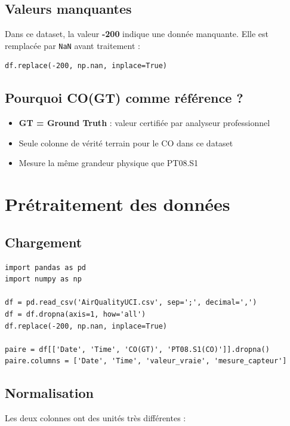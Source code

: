 \documentclass[12pt, a4paper]{article}
\begin{document}
\subsection{Valeurs manquantes}
Dans ce dataset, la valeur \textbf{-200} indique une donnée manquante. Elle est remplacée 
par \texttt{NaN} avant traitement :

\begin{lstlisting}[style=python, caption=Remplacement des valeurs manquantes]
df.replace(-200, np.nan, inplace=True)
\end{lstlisting}

\subsection{Pourquoi CO(GT) comme référence ?}
\begin{itemize}
    \item \textbf{GT = Ground Truth} : valeur certifiée par analyseur professionnel
    \item Seule colonne de vérité terrain pour le CO dans ce dataset
    \item Mesure la même grandeur physique que PT08.S1
\end{itemize}

\section{Prétraitement des données}

\subsection{Chargement}

\begin{lstlisting}[style=python, caption=Chargement du fichier CSV]
import pandas as pd
import numpy as np

df = pd.read_csv('AirQualityUCI.csv', sep=';', decimal=',')
df = df.dropna(axis=1, how='all')
df.replace(-200, np.nan, inplace=True)

paire = df[['Date', 'Time', 'CO(GT)', 'PT08.S1(CO)']].dropna()
paire.columns = ['Date', 'Time', 'valeur_vraie', 'mesure_capteur']
\end{lstlisting}

\subsection{Normalisation}
Les deux colonnes ont des unités très différentes :
\end{document}
